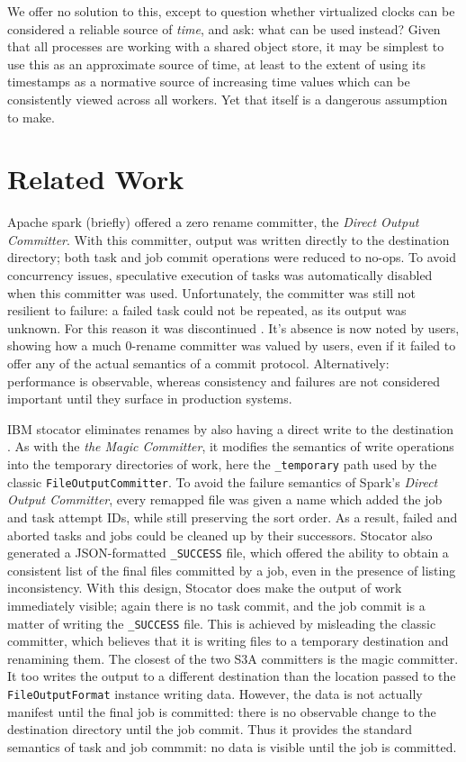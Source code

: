 \documentclass[9pt,technote]{IEEEtran}
\begin{document}
We offer no solution to this, except to question whether virtualized clocks can be considered a reliable source of \emph{time}, and ask: what can be used instead? Given that all processes are working with a shared object store, it may be simplest to use this as an approximate source of time, at least to the extent of using its timestamps as a normative source of increasing time values which can be consistently viewed across all workers. Yet that itself is a dangerous assumption to make. 

\section{Related Work}

Apache spark (briefly) offered a zero rename committer, the \emph{Direct Output Committer}\cite{JIRA}. With this committer, output was written directly to the destination directory; both task and job commit operations were reduced to no-ops. To avoid concurrency issues, speculative execution of tasks was automatically disabled when this committer was used. Unfortunately, the committer was still not resilient to failure: a failed task could not be repeated, as its output was unknown. For this reason it was discontinued \cite{DOC-JIRA}. It's absence is now noted by users, showing how a much 0-rename committer was valued by users, even if it failed to offer any of the actual semantics of a commit protocol. Alternatively: performance is observable, whereas consistency and failures are not considered important until they surface in production systems.

IBM stocator eliminates renames by also having a direct write to the destination  \cite{DBLP:journals/corr/abs-1709-01812}. As with the \emph{the Magic Committer}, it modifies the semantics of write operations into the temporary directories of work, here the \texttt{\_temporary} path used by the classic \texttt{FileOutputCommitter}.
To avoid the failure semantics of Spark's \emph{Direct Output Committer}, every remapped file was given a name which added the job and task attempt IDs, while still preserving the sort order. As a result, failed and aborted tasks and jobs could be cleaned up by their successors. Stocator also generated a JSON-formatted \texttt{\_SUCCESS} file, which offered the ability to obtain a consistent list of the final files committed by a job, even in the presence of listing inconsistency. With this design, Stocator does make the output of work immediately visible; again there is no task commit, and the job commit is a matter of writing the \texttt{\_SUCCESS} file. This is achieved by misleading the classic committer, which believes that it is writing files to a temporary destination and renamining them. The closest of the two S3A committers is the magic committer. It too writes the output to a different destination than the location passed to the \texttt{FileOutputFormat} instance writing data. However, the data is not actually manifest until the final job is committed: there is no observable change to the destination directory until the job commit. Thus it provides the standard semantics of task and job commmit: no data is visible until the job is committed.
\end{document}
